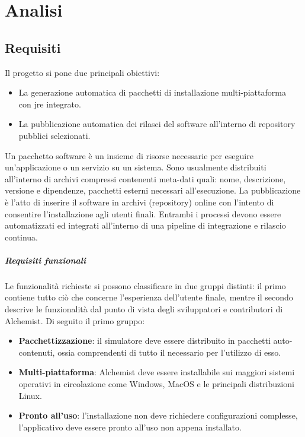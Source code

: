 \chapter{Analisi}

\section{Requisiti}

Il progetto si pone due principali obiettivi:
\begin{itemize}
	\setlength\itemsep{0.8em}
	\item La generazione automatica di pacchetti di installazione multi-piattaforma \\ con \ac{jre} integrato.
	\item La pubblicazione automatica dei rilasci del software all'interno di repository pubblici selezionati.
\end{itemize}
Un pacchetto software è un insieme di risorse necessarie per eseguire un'applicazione o un servizio su un sistema. Sono usualmente distribuiti all'interno di archivi compressi contenenti meta-dati quali: nome, descrizione, versione e dipendenze, pacchetti esterni necessari all'esecuzione. La pubblicazione è l'atto di inserire il software in archivi (repository) online con l'intento di consentire l'installazione agli utenti finali. Entrambi i processi devono essere automatizzati ed integrati all'interno di una pipeline di integrazione e rilascio continua.

\paragraph{Requisiti funzionali}

Le funzionalità richieste si possono classificare in due gruppi distinti: il primo contiene tutto ciò che concerne l'esperienza dell'utente finale, mentre il secondo descrive le funzionalità dal punto di vista degli sviluppatori e contributori di Alchemist. Di seguito il primo gruppo:
\begin{itemize}
	\item \textbf{Pacchettizzazione}: il simulatore deve essere distribuito in pacchetti auto-contenuti, ossia comprendenti di tutto il necessario per l'utilizzo di esso.
	\item \textbf{Multi-piattaforma}: Alchemist deve essere installabile sui maggiori sistemi operativi in circolazione come Windows, MacOS e le principali distribuzioni Linux.
	\item \textbf{Pronto all'uso}: l'installazione non deve richiedere configurazioni complesse, l'applicativo deve essere pronto all'uso non appena installato.
\end{itemize}

